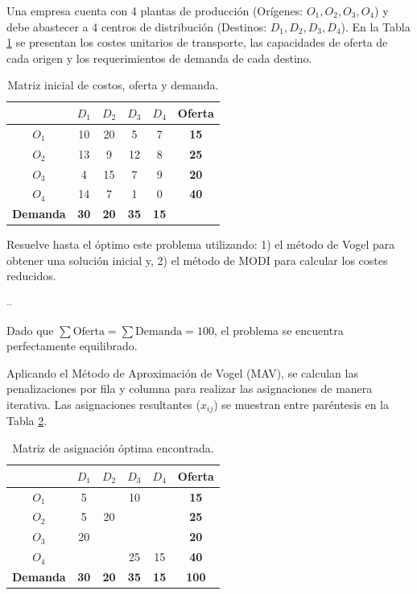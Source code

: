 Una empresa cuenta con 4 plantas de producción (Orígenes: $O_1, O_2, O_3, O_4$) y debe abastecer a 4 centros de distribución (Destinos: $D_1, D_2, D_3, D_4$). En la Tabla \ref{tab:enunciado} se presentan los costes unitarios de transporte, las capacidades de oferta de cada origen y los requerimientos de demanda de cada destino.

\begin{table}[htbp]
\centering
\caption{Matriz inicial de costos, oferta y demanda.}
\label{tab:enunciado}
\begin{tabular}{cccccc}
\toprule
& $D_1$ & $D_2$ & $D_3$ & $D_4$ & \textbf{Oferta} \\
\midrule
$O_1$ & 10 & 20 & 5  & 7  & \textbf{15} \\
$O_2$ & 13 & 9  & 12 & 8  & \textbf{25} \\
$O_3$ & 4  & 15 & 7  & 9  & \textbf{20} \\
$O_4$ & 14 & 7  & 1  & 0  & \textbf{40} \\
\midrule
\textbf{Demanda} & \textbf{30} & \textbf{20} & \textbf{35} & \textbf{15} &  \\
\bottomrule
\end{tabular}
\end{table}

Resuelve hasta el óptimo este problema utilizando: 1) el método de Vogel para obtener una solución inicial y, 2) el método de MODI para calcular los costes reducidos.

--

Dado que $\sum \text{Oferta} = \sum \text{Demanda} = 100$, el problema se encuentra perfectamente equilibrado. 

Aplicando el Método de Aproximación de Vogel (MAV), se calculan las penalizaciones por fila y columna para realizar las asignaciones de manera iterativa. Las asignaciones resultantes ($x_{ij}$) se muestran entre paréntesis en la Tabla \ref{tab:solucion}.

\begin{table}[htbp]
\centering
\caption{Matriz de asignación óptima encontrada.}
\label{tab:solucion}
\begin{tabular}{cccccc}
\toprule
& $D_1$ & $D_2$ & $D_3$ & $D_4$ & \textbf{Oferta} \\
\midrule
$O_1$ & 5  &       & 10  &        & \textbf{15} \\
$O_2$ & 5  & 20  &       &       & \textbf{25} \\
$O_3$ & 20  &       &        &        & \textbf{20} \\
$O_4$ &       &        & 25  & 15  & \textbf{40} \\
\midrule
\textbf{Demanda} & \textbf{30} & \textbf{20} & \textbf{35} & \textbf{15} & \textbf{100} \\
\bottomrule
\end{tabular}
\end{table}


